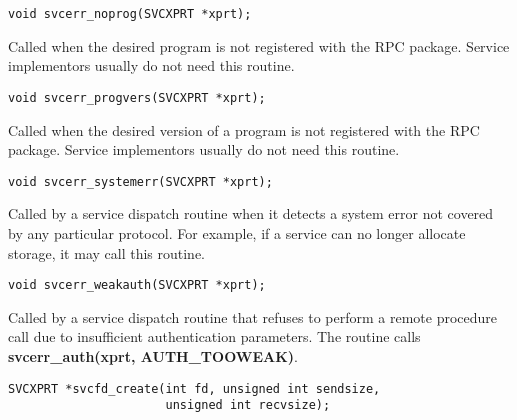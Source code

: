 \documentclass[]{article}
\let\realtextbf=\textbf
\renewcommand{\textbf}[1]{\textcolor{boldcolor}{\realtextbf{#1}}}
\begin{document}
\begin{verbatim}
void svcerr_noprog(SVCXPRT *xprt);
\end{verbatim}

\begin{description}
\itemsep1pt\parskip0pt
\item[]
Called when the desired program is not registered with the RPC package.
Service implementors usually do not need this routine.
\end{description}

\begin{verbatim}
void svcerr_progvers(SVCXPRT *xprt);
\end{verbatim}

\begin{description}
\itemsep1pt\parskip0pt
\item[]
Called when the desired version of a program is not registered with the
RPC package. Service implementors usually do not need this routine.
\end{description}

\begin{verbatim}
void svcerr_systemerr(SVCXPRT *xprt);
\end{verbatim}

\begin{description}
\itemsep1pt\parskip0pt
\item[]
Called by a service dispatch routine when it detects a system error not
covered by any particular protocol. For example, if a service can no
longer allocate storage, it may call this routine.
\end{description}

\begin{verbatim}
void svcerr_weakauth(SVCXPRT *xprt);
\end{verbatim}

\begin{description}
\itemsep1pt\parskip0pt
\item[]
Called by a service dispatch routine that refuses to perform a remote
procedure call due to insufficient authentication parameters. The
routine calls \textbf{svcerr\_auth(xprt, AUTH\_TOOWEAK)}.
\end{description}

\begin{verbatim}
SVCXPRT *svcfd_create(int fd, unsigned int sendsize,
                      unsigned int recvsize);
\end{verbatim}
\end{document}
